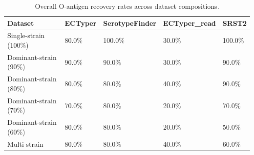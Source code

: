 \begin{table}[!ht]
\centering
\caption{Overall O-antigen recovery rates across dataset compositions.}
\label{tab:O_accuracy}

\begin{tabular}{lllll}
\toprule
Dataset & ECTyper & SerotypeFinder & ECTyper_read & SRST2\\
\midrule
Single-strain (100\%) & 80.0\% & 100.0\% & 30.0\% & 100.0\%\\
Dominant-strain (90\%) & 90.0\% & 90.0\% & 30.0\% & 90.0\%\\
Dominant-strain (80\%) & 80.0\% & 80.0\% & 40.0\% & 90.0\%\\
Dominant-strain (70\%) & 70.0\% & 80.0\% & 20.0\% & 70.0\%\\
Dominant-strain (60\%) & 80.0\% & 80.0\% & 20.0\% & 50.0\%\\
\addlinespace
Multi-strain & 80.0\% & 80.0\% & 40.0\% & 60.0\%\\
\bottomrule
\end{tabular}
\end{table}
